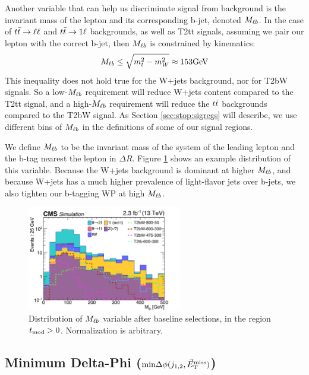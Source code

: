 Another variable that can help us discriminate signal from background
is the invariant mass of the lepton and its corresponding b-jet,
denoted $M_{\ell b}$. In the case of $t\bar{t} \rightarrow \ell\ell$ and $t\bar{t} \rightarrow 1\ell$
backgrounds, as well as T2tt signals, assuming we pair our lepton with
the correct b-jet, then $M_{\ell b}$ is constrained by kinematics:
\begin{equation}
\mlb \leq \sqrt{m_t^2 - m_W^2} \approx 153 \text{GeV} %
\end{equation}
This inequality does not hold true for the W+jets background, nor for T2bW
signals. So a low-$M_{\ell b}$ requirement will reduce W+jets content
compared to the T2tt signal, and a high-$M_{\ell b}$ requirement will reduce
the $t\bar{t}$ backgrounds compared to the T2bW signal. As Section
\ref{sec:stop:sigregs} will describe, we use different bins of
$M_{\ell b}$ in the definitions of some of our signal regions.

We define $M_{\ell b}$ to be the invariant mass of the system of the
leading lepton and the b-tag nearest the lepton in $\Delta R$. Figure
\ref{fig:stop:mlb} shows an example distribution of this
variable. Because the W+jets background is dominant at higher
$M_{\ell b}$, and because W+jets has a much higher prevalence of
light-flavor jets over b-jets, we also tighten our b-tagging WP at
high $M_{\ell b}$.

\begin{figure}
\centering
\includegraphics[width=0.6\textwidth]{figures/nminusone_mlb.pdf}
\caption{Distribution of $M_{\ell b}$ variable after baseline
  selections, in the region $t_\text{mod} > 0$. Normalization is arbitrary.}
\label{fig:stop:mlb}
\end{figure}

\subsection{Minimum Delta-Phi (\texorpdfstring{$\text{min}\Delta\phi(j_{1,2},\vec{E}_\text{T}^\text{miss})$}{minDphi})}
\label{ssec:stop:mindphi}

